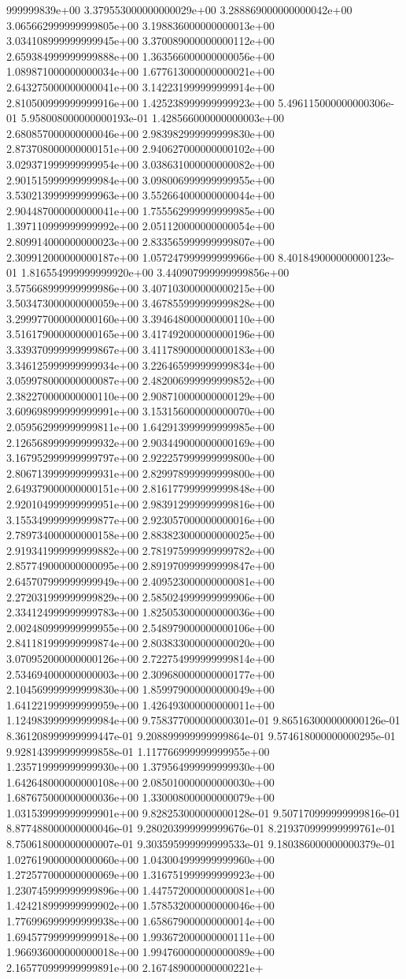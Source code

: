 999999839e+00	3.379553000000000029e+00	3.288869000000000042e+00	3.065662999999999805e+00	3.198836000000000013e+00	3.034108999999999945e+00	3.370089000000000112e+00	2.659384999999999888e+00	1.363566000000000056e+00	1.089871000000000034e+00	1.677613000000000021e+00	2.643275000000000041e+00	3.142231999999999914e+00	2.810500999999999916e+00	1.425238999999999923e+00	5.496115000000000306e-01	5.958008000000000193e-01	1.428566000000000003e+00	2.680857000000000046e+00	2.983982999999999830e+00	2.873708000000000151e+00	2.940627000000000102e+00	3.029371999999999954e+00	3.038631000000000082e+00	2.901515999999999984e+00	3.098006999999999955e+00	3.530213999999999963e+00	3.552664000000000044e+00	2.904487000000000041e+00	1.755562999999999985e+00	1.397110999999999992e+00	2.051120000000000054e+00	2.809914000000000023e+00	2.833565999999999807e+00	2.309912000000000187e+00	1.057247999999999966e+00	8.401849000000000123e-01	1.816554999999999920e+00	3.440907999999999856e+00	3.575668999999999986e+00	3.407103000000000215e+00	3.503473000000000059e+00	3.467855999999999828e+00	3.299977000000000160e+00	3.394648000000000110e+00	3.516179000000000165e+00	3.417492000000000196e+00	3.339370999999999867e+00	3.411789000000000183e+00	3.346125999999999934e+00	3.226465999999999834e+00	3.059978000000000087e+00	2.482006999999999852e+00	2.382270000000000110e+00	2.908710000000000129e+00	3.609698999999999991e+00	3.153156000000000070e+00	2.059562999999999811e+00	1.642913999999999985e+00	2.126568999999999932e+00	2.903449000000000169e+00	3.167952999999999797e+00	2.922257999999999800e+00	2.806713999999999931e+00	2.829978999999999800e+00	2.649379000000000151e+00	2.816177999999999848e+00	2.920104999999999951e+00	2.983912999999999816e+00	3.155349999999999877e+00	2.923057000000000016e+00	2.789734000000000158e+00	2.883823000000000025e+00	2.919341999999999882e+00	2.781975999999999782e+00	2.857749000000000095e+00	2.891970999999999847e+00	2.645707999999999949e+00	2.409523000000000081e+00	2.272031999999999829e+00	2.585024999999999906e+00	2.334124999999999783e+00	1.825053000000000036e+00	2.002480999999999955e+00	2.548979000000000106e+00	2.841181999999999874e+00	2.803833000000000020e+00	3.070952000000000126e+00	2.722754999999999814e+00	2.534694000000000003e+00	2.309680000000000177e+00	2.104569999999999830e+00	1.859979000000000049e+00	1.641221999999999959e+00	1.426493000000000011e+00	1.124983999999999984e+00	9.758377000000000301e-01	9.865163000000000126e-01	8.361208999999999447e-01	9.208899999999999864e-01	9.574618000000000295e-01	9.928143999999999858e-01	1.117766999999999955e+00	1.235719999999999930e+00	1.379564999999999930e+00	1.642648000000000108e+00	2.085010000000000030e+00	1.687675000000000036e+00	1.330008000000000079e+00	1.031539999999999901e+00	9.828253000000000128e-01	9.507170999999999816e-01	8.877488000000000046e-01	9.280203999999999676e-01	8.219370999999999761e-01	8.750618000000000007e-01	9.303595999999999533e-01	9.180386000000000379e-01	1.027619000000000060e+00	1.043004999999999960e+00	1.272577000000000069e+00	1.316751999999999923e+00	1.230745999999999896e+00	1.447572000000000081e+00	1.424218999999999902e+00	1.578532000000000046e+00	1.776996999999999938e+00	1.658679000000000014e+00	1.694577999999999918e+00	1.993672000000000111e+00	1.966936000000000018e+00	1.994760000000000089e+00	2.165770999999999891e+00	2.167489000000000221e+